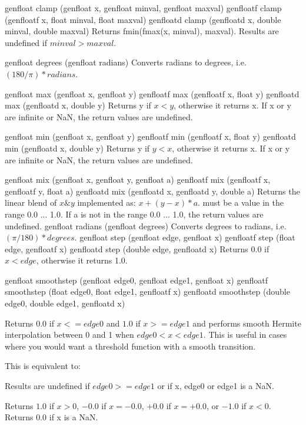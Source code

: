  
\addRowThreeSL
{genfloat clamp (genfloat x, genfloat minval, genfloat maxval)}
{genfloatf clamp (genfloatf x, float minval, float maxval)}
{genfloatd clamp (genfloatd x, double minval, double maxval)}
{
Returns fmin(fmax(x, minval), maxval).
Results are undefined if $minval > maxval$.
}

\addRow
{genfloat degrees (genfloat radians)}
{
 Converts radians to degrees,
i.e.$ (180 / \pi) *radians$.
}

\addRowThreeSL
 {genfloat max (genfloat x, genfloat y)}
 {genfloatf max (genfloatf x, float y)}
 {genfloatd max (genfloatd x, double y)}
{
Returns y if $x < y$, otherwise it returns x. If x or y
are infinite or NaN, the return values are undefined.
}

\addRowThreeSL
{genfloat min (genfloat x, genfloat y)}
{genfloatf min (genfloatf x, float y)}
{genfloatd min (genfloatd x, double y)}
{
Returns y if $y < x$, otherwise it returns x. If x or y
are infinite or NaN, the return values are undefined.
}

\addRowThreeSL
{genfloat mix (genfloat x, genfloat y, genfloat a)}
{genfloatf mix (genfloatf x, genfloatf y, float a)}
{genfloatd mix (genfloatd x, genfloatd y, double a)}
{
Returns the linear blend of $x \& y$ implemented as:
$x + (y - x) * a$.
 must be a value in the range 0.0 ... 1.0. If a is not
in the range 0.0 ... 1.0, the return values are
undefined.
}
\addRow
{genfloat radians (genfloat degrees) }
{
Converts degrees to radians, i.e. $(\pi / 180) * degrees$.
}
\addRowThreeSL
{genfloat step (genfloat edge, genfloat x)}
{genfloatf step (float edge, genfloatf x)}
{genfloatd step (double edge, genfloatd x)}
{
Returns 0.0 if $x < edge$, otherwise it returns 1.0.
}

\addRowThreeSL
{genfloat smoothstep (genfloat edge0,
genfloat edge1, genfloat x)}
{genfloatf smoothstep (float edge0,
float edge1, genfloatf x)}
{genfloatd smoothstep (double edge0,
double edge1, genfloatd x)}
{
Returns $0.0$ if $x <= edge0$ and $1.0$ if $x >= edge1$ and
performs smooth Hermite interpolation between 0
and 1 when $edge0 < x < edge1$. This is useful in
cases where you would want a threshold function
with a smooth transition.

This is equivalent to:\newline
{}\newline
{}\newline
{}\newline

Results are undefined if $edge0 >= edge1$ or if x,
edge0 or edge1 is a NaN.
}
{
Returns $1.0$ if $x > 0$, $-0.0$ if $x = -0.0$, $+0.0$ if $x =+0.0$, or $-1.0$
if $x < 0$. Returns $0.0$ if x is a NaN.
}
\completeTable


